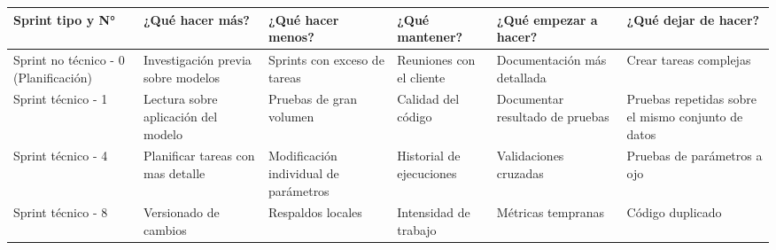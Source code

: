 \documentclass[
11pt, %
]{charter}
\begin{document}
\begin{table}[htpb]
\renewcommand{\arraystretch}{1.4}
\begin{tabular}{|>{\raggedright\arraybackslash}p{1.8cm}|
                >{\raggedright\arraybackslash}p{2.3cm}|
                >{\raggedright\arraybackslash}p{2.3cm}|
                >{\raggedright\arraybackslash}p{2.3cm}|
                >{\raggedright\arraybackslash}p{2.3cm}|
                >{\raggedright\arraybackslash}p{2.3cm}|}
\hline
\rowcolor[HTML]{CCCCCC} 
\textbf{Sprint tipo y N°} & \textbf{¿Qué hacer más?} & \textbf{¿Qué hacer menos?} & \textbf{¿Qué mantener?} & \textbf{¿Qué empezar a hacer?} & \textbf{¿Qué dejar de hacer?} \\\hline
Sprint no técnico - 0 (Planificación) & Investigación previa sobre modelos & Sprints con exceso de tareas  & Reuniones con el cliente & Documentación más detallada & Crear tareas complejas \\ \hline
Sprint técnico - 1 & Lectura sobre aplicación del modelo & Pruebas de gran volumen & Calidad del código & Documentar resultado de pruebas & Pruebas repetidas sobre el mismo conjunto de datos \\ \hline


Sprint técnico - 4 & Planificar tareas con mas detalle & Modificación individual de parámetros & Historial de ejecuciones & Validaciones cruzadas & Pruebas de parámetros a ojo \\ \hline
Sprint técnico - 8 & Versionado de cambios & Respaldos locales & Intensidad de trabajo & Métricas tempranas & Código duplicado \\ \hline
\end{tabular}
\end{table}
\end{document}
